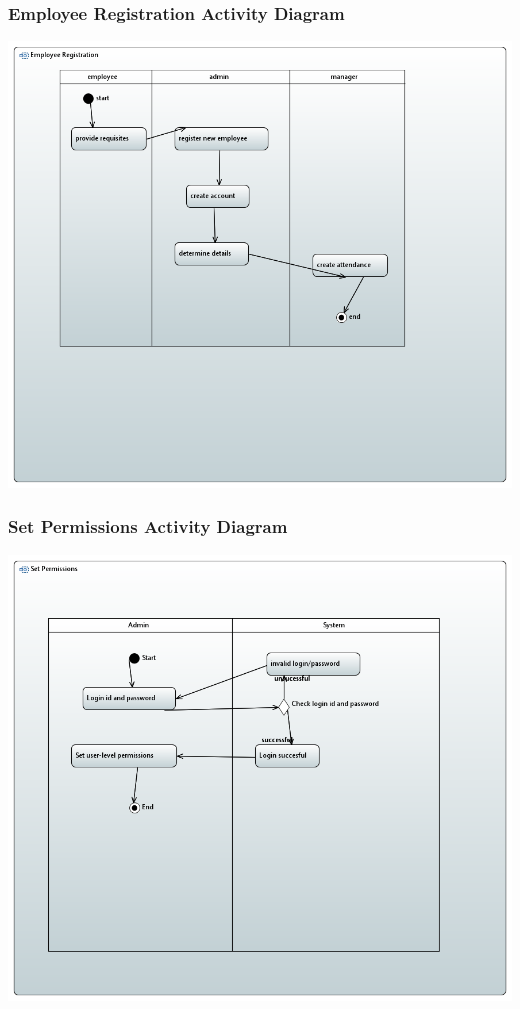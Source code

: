 \documentclass[a4paper, 12pt]{article}
\begin{document}
\subsubsection{Employee Registration Activity Diagram}
\begin{center}
\includegraphics[width=1\textwidth]{Employee_Registration_Activity_Diagram.PNG}\par
\end{center}
\subsubsection{Set Permissions Activity Diagram}
\begin{center}
\includegraphics[width=1\textwidth]{Set_Permissions_Activity_Diagram.PNG}\par
\end{center}
\end{document}
